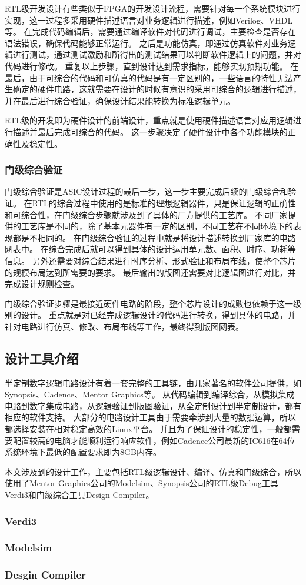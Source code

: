 \documentclass[UTF8]{ctexart}
\begin{document}
RTL级开发设计有些类似于FPGA的开发设计流程，需要针对每一个系统模块进行实现，这一过程多采用硬件描述语言对业务逻辑进行描述，例如Verilog、VHDL等\cite{xiecs2001}。
在完成代码编辑后，需要通过编译软件对代码进行调试，主要检查是否存在语法错误，确保代码能够正常运行。
之后是功能仿真，即通过仿真软件对业务逻辑进行测试，通过测试激励和所得出的测试结果可以判断软件逻辑上的问题，并对代码进行修改。
重复以上步骤，直到设计达到需求指标，能够实现预期功能。
在最后，由于可综合的代码和可仿真的代码是有一定区别的，一些语言的特性无法产生确定的硬件电路，这就需要在设计的时候有意识的采用可综合的逻辑进行描述，并在最后进行综合验证，确保设计结果能转换为标准逻辑单元。

RTL级的开发即为硬件设计的前端设计，重点就是使用硬件描述语言对应用逻辑进行描述并最后完成可综合的代码。
这一步骤决定了硬件设计中各个功能模块的正确性及稳定性。

\subsubsection{门级综合验证}

门级综合验证是ASIC设计过程的最后一步，这一步主要完成后续的门级综合和验证。
在RTL的综合过程中使用的是标准的理想逻辑器件，只是保证逻辑的正确性和可综合性，在门级综合步骤就涉及到了具体的厂方提供的工艺库。
不同厂家提供的工艺库是不同的，除了基本元器件有一定的区别，不同工艺在不同环境下的表现都是不相同的。
在门级综合验证的过程中就是将设计描述转换到厂家库的电路网表中。
在综合完成后就可以得到具体的设计运用单元数、面积、时序、功耗等信息。
另外还需要对综合结果进行时序分析、形式验证和布局布线，使整个芯片的规模布局达到所需要的要求。
最后输出的版图还需要对比逻辑图进行对比，并完成设计规则检查。

门级综合验证步骤是最接近硬件电路的阶段，整个芯片设计的成败也依赖于这一级别的设计。
重点就是对已经完成逻辑设计的代码进行转换，得到具体的电路，并针对电路进行仿真、修改、布局布线等工作，最终得到版图网表。

\subsection{设计工具介绍}

半定制数字逻辑电路设计有着一套完整的工具链，由几家著名的软件公司提供，如Synopsis、Cadence、Mentor Graphics等。
从代码编辑到编译综合，从模拟集成电路到数字集成电路，从逻辑验证到版图验证，从全定制设计到半定制设计，都有相应的软件支持。
大部分的电路设计工具由于需要牵涉到大量的数据运算，所以都选择安装在相对稳定高效的Linux平台。
并且为了保证设计的稳定性，一般都需要配置较高的电脑才能顺利运行响应软件，例如Cadence公司最新的IC616在64位系统环境下最低的配置要求即为8GB内存。

本文涉及到的设计工作，主要包括RTL级逻辑设计、编译、仿真和门级综合，所以使用了Mentor Graphics公司的Modelsim、Synopsis公司的RTL级Debug工具Verdi3和门级综合工具Design Compiler。

\subsubsection{Verdi3}



\subsubsection{Modelsim}

\subsubsection{Desgin Compiler}


\end{document}
